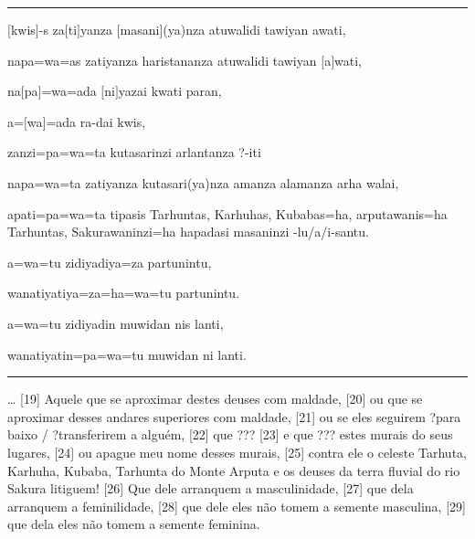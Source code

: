 \vspace{10pt}
\hrule
\vspace{10pt}


\setcounter{parcount}{18}
\begin{parnumbersa}[]

	\raggedright%
	\itshape%



	$[$kwis$]$-s za$[$ti$]$yanza $[$masani$]${(ya)}nza atuwalidi
	tawiyan awati,

	napa=wa=as zatiyanza haristananza atuwalidi tawiyan $[$a$]$wati,

	na$[$pa$]$=wa=ada $[$ni$]$yazai kwati paran,

	a=$[$wa$]$=ada ra-dai kwis,

	zanzi=pa=wa=ta kutasarinzi arlantanza {?}-iti

	napa=wa=ta zatiyanza kutasari{(ya)}nza amanza alamanza arha walai,

	apati=pa=wa=ta tipasis Tarhuntas, Karhuhas, Kubabas=ha, arputawanis=ha
	Tarhuntas, Sakurawaninzi=ha hapadasi masaninzi -lu/a/i-santu.

	a=wa=tu zidiyadiya=za partunintu,

	wanatiyatiya=za=ha=wa=tu partunintu.

	a=wa=tu zidiyadin muwidan nis lanti,

	wanatiyatin=pa=wa=tu muwidan ni lanti.

\end{parnumbersa}

\vspace{10pt}
\hrule
\vspace{10pt}



\ldots{}
[19] Aquele que se aproximar destes deuses com maldade,
[20] ou que se aproximar desses andares superiores com maldade,
[21] ou se eles seguirem {?}para baixo / {?}transferirem a alguém,
[22] que {???}
	[23] e que {???} estes murais do seus lugares,
[24] ou apague meu nome desses murais,
[25] contra ele o celeste Tarhuta, Karhuha, Kubaba, Tarhunta do Monte Arputa e
os deuses da terra fluvial do rio Sakura litiguem!
[26] Que dele arranquem a masculinidade,
[27] que dela arranquem a feminilidade,
[28] que dele eles não tomem a semente masculina,
[29] que dela eles não tomem a semente feminina.

\clearpage

